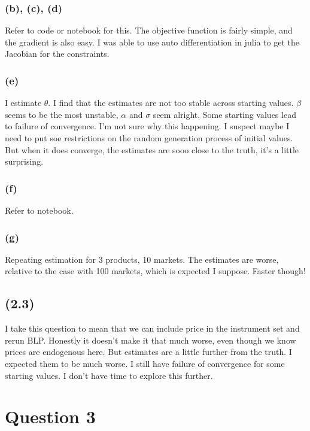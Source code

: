 \documentclass[11pt]{article}
\begin{document}
\subsubsection*{(b), (c), (d)}
Refer to code or notebook for this. 
The objective function is fairly simple, and the gradient is also easy.
I was able to use auto differentiation in julia to get the Jacobian for the constraints. 



\subsubsection*{(e)}

I estimate $\theta$. 
I find that the estimates are not too stable across starting values. 
$\beta$ seems to be the most unstable, $\alpha$ and $\sigma$ seem alright. 
Some starting values lead to failure of convergence. I'm not sure why this happening. 
I suspect maybe I need to put soe restrictions on the random generation process of initial values. 
But when it does converge, the estimates are sooo close to the truth, it's a little surprising. 


\subsubsection*{(f)}
Refer to notebook. 

\subsubsection*{(g)}

Repeating estimation for 3 products, 10 markets. 
The estimates are worse, relative to the case with 100 markets, which is expected I suppose.
Faster though!

\subsection*{(2.3)}

I take this question to mean that we can include price in the instrument set and rerun BLP. 
Honestly it doesn't make it that much worse, even though we know prices are endogenous here.
But estimates are a little further from the truth. 
I expected them to be much worse. 
I still have failure of convergence for some starting values. 
I don't have time to explore this further. 

\section*{Question 3}
\end{document}
